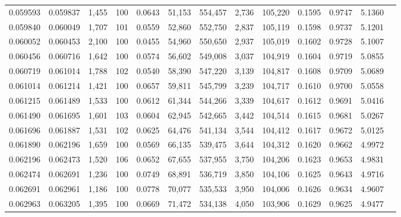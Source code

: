 \begin{tabular}{rrrrrrrrrrrrr}
0.059593 & 0.059837 & 1,455 & 100 &                                     0.0643 &  51,153 & 554,457 &   2,736 & 105,220 & 0.1595 & 0.9747 & 5.1360 \\
0.059840 & 0.060049 & 1,707 & 101 &                                     0.0559 &  52,860 & 552,750 &   2,837 & 105,119 & 0.1598 & 0.9737 & 5.1201 \\
0.060052 & 0.060453 & 2,100 & 100 &                                     0.0455 &  54,960 & 550,650 &   2,937 & 105,019 & 0.1602 & 0.9728 & 5.1007 \\
0.060456 & 0.060716 & 1,642 & 100 &                                     0.0574 &  56,602 & 549,008 &   3,037 & 104,919 & 0.1604 & 0.9719 & 5.0855 \\
0.060719 & 0.061014 & 1,788 & 102 &                                     0.0540 &  58,390 & 547,220 &   3,139 & 104,817 & 0.1608 & 0.9709 & 5.0689 \\
0.061014 & 0.061214 & 1,421 & 100 &                                     0.0657 &  59,811 & 545,799 &   3,239 & 104,717 & 0.1610 & 0.9700 & 5.0558 \\
0.061215 & 0.061489 & 1,533 & 100 &                                     0.0612 &  61,344 & 544,266 &   3,339 & 104,617 & 0.1612 & 0.9691 & 5.0416 \\
0.061490 & 0.061695 & 1,601 & 103 &                                     0.0604 &  62,945 & 542,665 &   3,442 & 104,514 & 0.1615 & 0.9681 & 5.0267 \\
0.061696 & 0.061887 & 1,531 & 102 &                                     0.0625 &  64,476 & 541,134 &   3,544 & 104,412 & 0.1617 & 0.9672 & 5.0125 \\
0.061890 & 0.062196 & 1,659 & 100 &                                     0.0569 &  66,135 & 539,475 &   3,644 & 104,312 & 0.1620 & 0.9662 & 4.9972 \\
0.062196 & 0.062473 & 1,520 & 106 &                                     0.0652 &  67,655 & 537,955 &   3,750 & 104,206 & 0.1623 & 0.9653 & 4.9831 \\
0.062474 & 0.062691 & 1,236 & 100 &                                     0.0749 &  68,891 & 536,719 &   3,850 & 104,106 & 0.1625 & 0.9643 & 4.9716 \\
0.062691 & 0.062961 & 1,186 & 100 &                                     0.0778 &  70,077 & 535,533 &   3,950 & 104,006 & 0.1626 & 0.9634 & 4.9607 \\
0.062963 & 0.063205 & 1,395 & 100 &                                     0.0669 &  71,472 & 534,138 &   4,050 & 103,906 & 0.1629 & 0.9625 & 4.9477 \\

\end{tabular}
